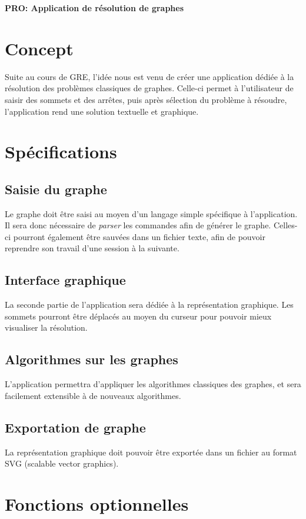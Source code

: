 \documentclass[french]{article}
\begin{document}
	\centering
	\large{\textbf{PRO: Application de résolution de graphes}}
	
	\justify
	
	\section{Concept}
		Suite au cours de GRE, l'idée nous est venu de créer une application dédiée à la résolution des problèmes classiques de graphes. Celle-ci permet à l'utilisateur de saisir des sommets et des arrêtes, puis après sélection du problème à résoudre, l'application rend une solution textuelle et graphique.
		
	\section{Spécifications}
		\subsection{Saisie du graphe}
			Le graphe doit être saisi au moyen d'un langage simple spécifique à l'application. Il sera donc nécessaire de \textit{parser} les commandes afin de générer le graphe. Celles-ci pourront également être sauvées dans un fichier texte, afin de pouvoir reprendre son travail d'une session à la suivante.
		
		\subsection{Interface graphique}
			La seconde partie de l'application sera dédiée à la représentation graphique. Les sommets pourront être déplacés au moyen du curseur pour pouvoir mieux visualiser la résolution.
			
		\subsection{Algorithmes sur les graphes}
			L'application permettra d'appliquer les algorithmes classiques des graphes, et sera facilement extensible à de nouveaux algorithmes. 
		
		\subsection{Exportation de graphe}
			La représentation graphique doit pouvoir être exportée dans un fichier au format SVG (scalable vector graphics).
		
	\section{Fonctions optionnelles}
\end{document}
